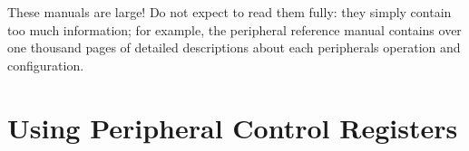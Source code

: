 \documentclass[openany,11pt,fleqn]{book} %
\begin{document}
\begin{warning}
    These manuals are large! Do not expect to read them fully: they simply contain too much information; for example, the peripheral reference manual contains over one thousand pages of detailed descriptions about each peripherals operation and configuration.
\end{warning}


\section{Using Peripheral Control Registers}



%
%
%
%
%    
%
%
\end{document}
